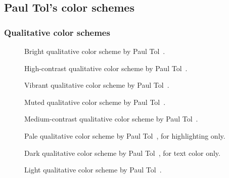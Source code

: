 \documentclass{article}
\begin{document}
\subsection{Paul Tol's color schemes}

\subsubsection{Qualitative color schemes}

\begin{figure}[ht]
    \centering
    \caption{Bright qualitative color scheme by Paul Tol~\cite{Tol}.}
    \label{fig:T-Q-B}
\end{figure}

\begin{figure}[ht]
    \centering
    \caption{High-contrast qualitative color scheme by Paul Tol~\cite{Tol}.}
    \label{fig:T-Q-HC}
\end{figure}

\begin{figure}[ht]
    \centering
    \caption{Vibrant qualitative color scheme by Paul Tol~\cite{Tol}.}
    \label{fig:T-Q-V}
\end{figure}

\begin{figure}[ht]
    \centering
    \caption{Muted qualitative color scheme by Paul Tol~\cite{Tol}.}
    \label{fig:T-Q-M}
\end{figure}

\begin{figure}[ht]
    \centering
    \caption{Medium-contrast qualitative color scheme by Paul Tol~\cite{Tol}.}
    \label{fig:T-Q-MC}
\end{figure}

\begin{figure}[ht]
    \centering
    \caption{Pale qualitative color scheme by Paul Tol~\cite{Tol}, for highlighting only.}
    \label{fig:T-Q-PH}
\end{figure}

\begin{figure}[ht]
    \centering
    \caption{Dark qualitative color scheme by Paul Tol~\cite{Tol}, for text color only.}
    \label{fig:T-Q-DT}
\end{figure}

\begin{figure}[ht]
    \centering
    \caption{Light qualitative color scheme by Paul Tol~\cite{Tol}.}
    \label{fig:T-Q-L}
\end{figure}
\end{document}
